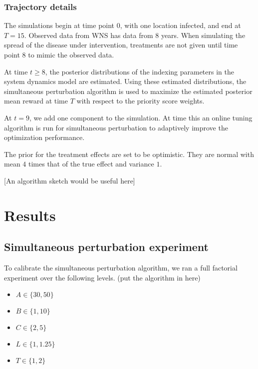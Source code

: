 \documentclass[11pt]{article}
\begin{document}
\subsubsection{Trajectory details}
\label{sec-4-1-2}

The simulations begin at time point $0$, with one location infected,
and end at $T=15$.  Observed data from WNS has data from $8$ years.
When simulating the spread of the disease under intervention,
treatments are not given until time point $8$ to mimic the observed
data.

At time $t \ge 8$, the posterior distributions of the indexing
parameters in the system dynamics model are estimated.  Using these
estimated distributions, the simultaneous perturbation algorithm is
used to maximize the estimated posterior mean reward at time $T$
with respect to the priority score weights.

At $t = 9$, we add one component to the simulation.  At time this an
online tuning algorithm is run for simultaneous perturbation to
adaptively improve the optimization performance.

The prior for the treatment effects are set to be optimistic.  They
are normal with mean $4$ times that of the true effect and variance
$1$.

[An algorithm sketch would be useful here]


\newpage

\section{Results}
\label{sec-5}

\subsection{Simultaneous perturbation experiment}
\label{sec-5-1}

To calibrate the simultaneous perturbation algorithm, we ran a full
factorial experiment over the following levels. (put the algorithm
in here)

\begin{itemize}
  \item $A \in \lbrace 30, 50 \rbrace $
  \item $B \in \lbrace 1, 10 \rbrace $
  \item $C \in \lbrace 2, 5 \rbrace $
  \item $L \in \lbrace 1, 1.25 \rbrace $
  \item $T \in \lbrace 1, 2 \rbrace $
\end{itemize}
\end{document}
